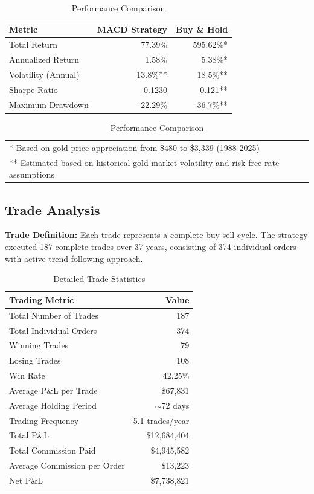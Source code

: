 \documentclass[11pt,a4paper]{article}
\begin{document}
\begin{table}[H]
\centering
\begin{tabular}{lrr}
\toprule
\textbf{Metric} & \textbf{MACD Strategy} & \textbf{Buy \& Hold} \\
\midrule
Total Return & \textcolor{profit}{77.39\%} & \textcolor{profit}{595.62\%}* \\
Annualized Return & \textcolor{profit}{1.58\%} & \textcolor{profit}{5.38\%}* \\
Volatility (Annual) & 13.8\%** & 18.5\%** \\
Sharpe Ratio & 0.1230 & 0.121** \\
Maximum Drawdown & \textcolor{loss}{-22.29\%} & \textcolor{loss}{-36.7\%}** \\
\bottomrule
\end{tabular}
\caption{Performance Comparison}
\label{tab:performance}
\begin{tabular}{p{\textwidth}}
\footnotesize
* Based on gold price appreciation from \$480 to \$3,339 (1988-2025)\\
** Estimated based on historical gold market volatility and risk-free rate assumptions
\end{tabular}
\end{table}

\subsection{Trade Analysis}

\textbf{Trade Definition:} Each trade represents a complete buy-sell cycle. The strategy executed 187 complete trades over 37 years, consisting of 374 individual orders with active trend-following approach.

\begin{table}[H]
\centering
\begin{tabular}{lr}
\toprule
\textbf{Trading Metric} & \textbf{Value} \\
\midrule
Total Number of Trades & 187 \\
Total Individual Orders & 374 \\
Winning Trades & 79 \\
Losing Trades & 108 \\
Win Rate & \textcolor{neutral}{42.25\%} \\
Average P\&L per Trade & \textcolor{profit}{\$67,831} \\
Average Holding Period & $\sim$72 days \\
Trading Frequency & 5.1 trades/year \\
Total P\&L & \textcolor{profit}{\$12,684,404} \\
Total Commission Paid & \textcolor{loss}{\$4,945,582} \\
Average Commission per Order & \textcolor{loss}{\$13,223} \\
Net P\&L & \textcolor{profit}{\$7,738,821} \\
\bottomrule
\end{tabular}
\caption{Detailed Trade Statistics}
\end{table}
\end{document}
